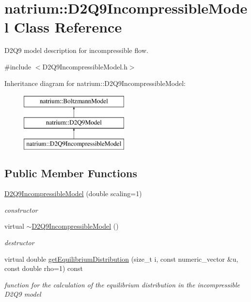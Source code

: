 \hypertarget{classnatrium_1_1D2Q9IncompressibleModel}{\section{natrium\-:\-:D2\-Q9\-Incompressible\-Model Class Reference}
\label{classnatrium_1_1D2Q9IncompressibleModel}
}


D2\-Q9 model description for incompressible flow.  




{\ttfamily \#include $<$D2\-Q9\-Incompressible\-Model.\-h$>$}

Inheritance diagram for natrium\-:\-:D2\-Q9\-Incompressible\-Model\-:\begin{figure}[H]
\begin{center}
\leavevmode
\includegraphics[height=3.000000cm]{classnatrium_1_1D2Q9IncompressibleModel}
\end{center}
\end{figure}
\subsection*{Public Member Functions}
\begin{DoxyCompactItemize}
\item 
\hypertarget{classnatrium_1_1D2Q9IncompressibleModel_a2ebdd3442edd4e3f38798a99b8413fcb}{\hyperlink{classnatrium_1_1D2Q9IncompressibleModel_a2ebdd3442edd4e3f38798a99b8413fcb}{D2\-Q9\-Incompressible\-Model} (double scaling=1)}\label{classnatrium_1_1D2Q9IncompressibleModel_a2ebdd3442edd4e3f38798a99b8413fcb}

\begin{DoxyCompactList}\small\item\em constructor \end{DoxyCompactList}\item 
virtual \hyperlink{classnatrium_1_1D2Q9IncompressibleModel_a6e757941f7ca2c5a6148893147211724}{$\sim$\-D2\-Q9\-Incompressible\-Model} ()
\begin{DoxyCompactList}\small\item\em destructor \end{DoxyCompactList}\item 
virtual double \hyperlink{classnatrium_1_1D2Q9IncompressibleModel_ac461ec3ce0f4ecd742dfbdfb1bce7d5a}{get\-Equilibrium\-Distribution} (size\-\_\-t i, const numeric\-\_\-vector \&u, const double rho=1) const 
\begin{DoxyCompactList}\small\item\em function for the calculation of the equilibrium distribution in the incompressible D2\-Q9 model \end{DoxyCompactList}\end{DoxyCompactItemize}
